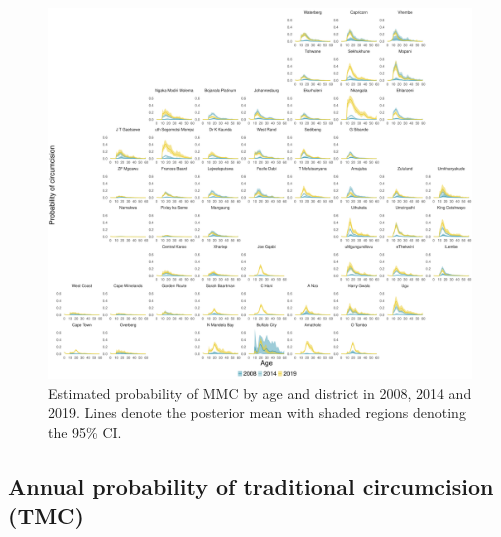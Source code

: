 \documentclass{article}
\begin{document}
\begin{appendix}
\begin{figure}[H]
	\centering
	\includegraphics[width = \linewidth]{Figures/suppmat/Rates/ProbabilityofMMC_SingleAge_District.pdf}
	\caption{Estimated probability of MMC by age and district in 2008, 2014 and 2019. Lines denote the posterior mean with shaded regions denoting the 95\% CI.}
\end{figure}	


\subsection{Annual probability of traditional circumcision (TMC)}



\end{appendix}
\end{document}
